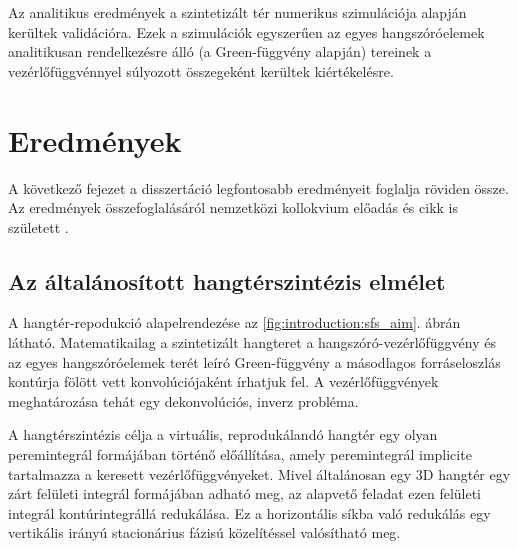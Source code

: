 \documentclass[10pt,twoside]{article}
\theoremstyle{thesisgroupstyle}
\theoremstyle{indented}
\begin{document}
Az analitikus eredmények a szintetizált tér numerikus szimulációja alapján kerültek validációra.
Ezek a szimulációk egyszerűen az egyes hangszóróelemek analitikusan rendelkezésre álló (a Green-függvény alapján) tereinek a vezérlőfüggvénnyel súlyozott összegeként kerültek kiértékelésre. 

\section{Eredmények}

A következő fejezet a disszertáció legfontosabb eredményeit foglalja röviden össze.
Az eredmények összefoglalásáról nemzetközi kollokvium előadás és cikk is született \cite{Firtha2019:daga_booklet}.

\subsection{Az általánosított hangtérszintézis elmélet}

A hangtér-repodukció alapelrendezése az \ref{fig:introduction:sfs_aim}. ábrán látható.
Matematikailag a szintetizált hangteret a hangszóró-vezérlőfüggvény és az egyes hangszóróelemek terét leíró Green-függvény a másodlagos forráseloszlás kontúrja fölött vett konvolúciójaként írhatjuk fel.
A vezérlőfüggvények meghatározása tehát egy dekonvolúciós, inverz probléma.

A hangtérszintézis célja a virtuális, reprodukálandó hangtér egy olyan peremintegrál formájában történő előállítása, amely peremintegrál implicite tartalmazza a keresett vezérlőfüggvényeket.
Mivel általánosan egy 3D hangtér egy zárt felületi integrál formájában adható meg, az alapvető feladat ezen felületi integrál kontúrintegrállá redukálása.
Ez a horizontális síkba való redukálás egy vertikális irányú stacionárius fázisú közelítéssel valósítható meg.
\end{document}
